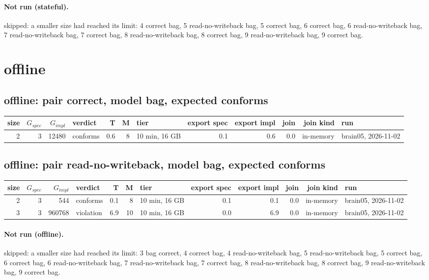 \documentclass[10pt]{article}
\begin{document}
\paragraph{Not run (stateful).}
skipped: a smaller size had reached its limit: 4 correct bag, 5 read-no-writeback bag, 5 correct bag, 6 correct bag, 6 read-no-writeback bag, 7 read-no-writeback bag, 7 correct bag, 8 read-no-writeback bag, 8 correct bag, 9 read-no-writeback bag, 9 correct bag.\par
\section*{offline}
\subsection*{offline: pair \textsf{correct}, model bag, expected conforms}
\begin{longtable}{@{}rrrlrrlrrrrl@{}}
\toprule
size & $G_{\mathit{spec}}$ & $G_{\mathit{impl}}$ & verdict & T & M & tier & export spec & export impl & join & join kind & run \\
\midrule
\endhead
\color{red} 2 & 3 & 12480 & conforms & 0.6 & 8 & 10 min, 16 GB & 0.1 & 0.6 & 0.0 & in-memory & brain05, 2026-11-02 \\
\bottomrule
\end{longtable}
\subsection*{offline: pair \textsf{read-no-writeback}, model bag, expected conforms}
\begin{longtable}{@{}rrrlrrlrrrrl@{}}
\toprule
size & $G_{\mathit{spec}}$ & $G_{\mathit{impl}}$ & verdict & T & M & tier & export spec & export impl & join & join kind & run \\
\midrule
\endhead
\color{red} 2 & 3 & 544 & conforms & 0.1 & 8 & 10 min, 16 GB & 0.1 & 0.1 & 0.0 & in-memory & brain05, 2026-11-02 \\
\color{red} 3 & 3 & 960768 & violation & 6.9 & 10 & 10 min, 16 GB & 0.0 & 6.9 & 0.0 & in-memory & brain05, 2026-11-02 \\
\bottomrule
\end{longtable}
\paragraph{Not run (offline).}
skipped: a smaller size had reached its limit: 3 bag correct, 4 correct bag, 4 read-no-writeback bag, 5 read-no-writeback bag, 5 correct bag, 6 correct bag, 6 read-no-writeback bag, 7 read-no-writeback bag, 7 correct bag, 8 read-no-writeback bag, 8 correct bag, 9 read-no-writeback bag, 9 correct bag.\par
\end{document}
